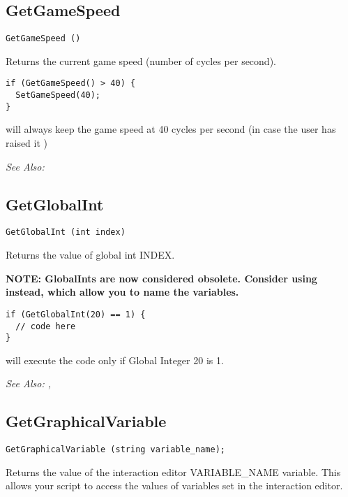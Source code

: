 \subsection{GetGameSpeed}\label{GetGameSpeed}%

\begin{verbatim}
GetGameSpeed ()
\end{verbatim}
Returns the current game speed (number of cycles per second).

\begin{verbatim}
if (GetGameSpeed() > 40) {
  SetGameSpeed(40);
}
\end{verbatim}
will always keep the game speed at 40 cycles per second (in case the user has raised it )

\it{See Also:} 


\subsection{GetGlobalInt}\label{GetGlobalInt}%

\begin{verbatim}
GetGlobalInt (int index)
\end{verbatim}
Returns the value of global int INDEX.

\bf{NOTE:} GlobalInts are now considered obsolete. Consider using
 instead, which allow you to name
the variables.

\begin{verbatim}
if (GetGlobalInt(20) == 1) {
  // code here
}
\end{verbatim}
will execute the code only if Global Integer 20 is 1.

\it{See Also:} , 



\subsection{GetGraphicalVariable}\label{GetGraphicalVariable}%

\begin{verbatim}
GetGraphicalVariable (string variable_name);
\end{verbatim}
Returns the value of the interaction editor VARIABLE_NAME variable. This allows your
script to access the values of variables set in the interaction editor.

